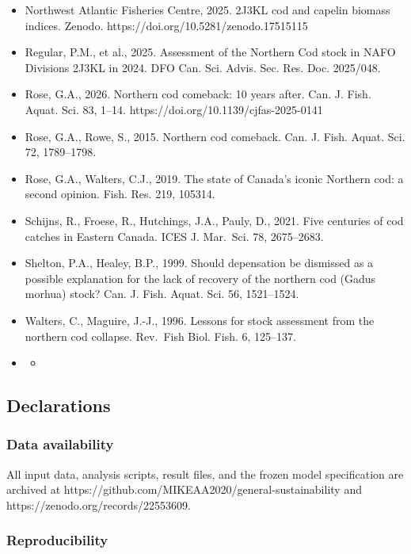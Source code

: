 \documentclass[11pt]{article}
\providecommand{\tightlist}{\setlength{\itemsep}{0.2em}\setlength{\parskip}{0pt}}
\begin{document}
\begin{itemize}
  Advis. Sec. Res. Doc. 2025/022.
\item
  Northwest Atlantic Fisheries Centre, 2025. 2J3KL cod and capelin
  biomass indices. Zenodo. https://doi.org/10.5281/zenodo.17515115
\item
  Regular, P.M., et al., 2025. Assessment of the Northern Cod stock in
  NAFO Divisions 2J3KL in 2024. DFO Can. Sci. Advis. Sec. Res. Doc.
  2025/048.
\item
  Rose, G.A., 2026. Northern cod comeback: 10 years after. Can. J. Fish.
  Aquat. Sci. 83, 1--14. https://doi.org/10.1139/cjfas-2025-0141
\item
  Rose, G.A., Rowe, S., 2015. Northern cod comeback. Can. J. Fish.
  Aquat. Sci. 72, 1789--1798.
\item
  Rose, G.A., Walters, C.J., 2019. The state of Canada's iconic Northern
  cod: a second opinion. Fish. Res. 219, 105314.
\item
  Schijns, R., Froese, R., Hutchings, J.A., Pauly, D., 2021. Five
  centuries of cod catches in Eastern Canada. ICES J. Mar.~Sci. 78,
  2675--2683.
\item
  Shelton, P.A., Healey, B.P., 1999. Should depensation be dismissed as
  a possible explanation for the lack of recovery of the northern cod
  (Gadus morhua) stock? Can. J. Fish. Aquat. Sci. 56, 1521--1524.
\item
  Walters, C., Maguire, J.-J., 1996. Lessons for stock assessment from
  the northern cod collapse. Rev.~Fish Biol. Fish. 6, 125--137.
\item
  \begin{itemize}
  \tightlist
  \item
  \end{itemize}
\end{itemize}

\subsection{Declarations}\label{declarations}

\subsubsection{Data availability}\label{data-availability}

All input data, analysis scripts, result files, and the frozen model
specification are archived at
https://github.com/MIKEAA2020/general-sustainability and
https://zenodo.org/records/22553609.

\subsubsection{Reproducibility}\label{reproducibility}
\end{document}
